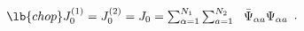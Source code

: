 \begin{equation}
\begin{array}{l}
\lb{chop}   
J_{0}^{(1)}  = J_{0}^{(2)}=J_{0}= \sum_{\alpha =1}^{N_{1}}
\sum_{a=1}^{N_{2}}\ \ 
{\bar{\Psi}}_{{\alpha}{a}} \Psi_{\alpha a}
\end{array} .
\end{equation}\
